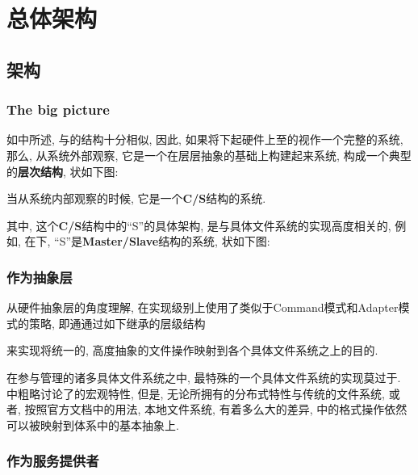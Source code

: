 \chapter{\HFS 总体架构}
\label{ch:hfs}

\section{\HFS 架构}
\label{sec:hfs:arch}

\subsection{The big picture}
\label{ssec:hfs:bigpic}

如中所述, {\HFS}与{\VFS}的结构十分相似,
因此, 如果将下起硬件上至{\HFS}的视作一个完整的系统, 那么,
从系统外部观察{\HFS}, 它是一个在层层抽象的基础上构建起来系统,
构成一个典型的\textbf{层次结构},
状如下图:


当从系统内部观察{\HFS}的时候, 它是一个\textbf{C/S}结构的系统.

其中, 这个\textbf{C/S}结构中的``S''的具体架构,
是与具体文件系统的实现高度相关的, 例如, 在{\HDFS}下,
``S''是\textbf{Master/Slave}结构的系统, 状如下图:


\subsection{作为抽象层}
\label{ssec:hfs:al}

从硬件抽象层的角度理解{\HFS},
{\HFS}在实现级别上使用了类似于Command模式和Adapter模式的策略,
即通通过如下继承的层级结构


来实现将统一的, 高度抽象的文件操作映射到各个具体文件系统之上的目的.

在{\HFS}参与管理的诸多具体文件系统之中, 最特殊的一个具体文件系统的实现莫过于{\HDFS}.
中粗略讨论了{\HDFS}的宏观特性,
但是, 无论{\HDFS}所拥有的分布式特性与传统的文件系统, 或者, 按照官方文档中的用法, 本地文件系统,
有着多么大的差异, {\HDFS}中的格式操作依然可以被映射到{\HFS}体系中的基本抽象上.


\subsection{作为服务提供者}
\label{ssec:hfs:srv}

